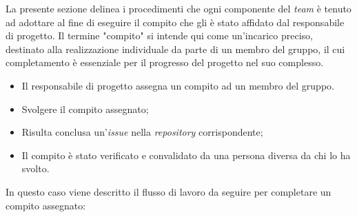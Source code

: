 \label{lavoro-sul-progetto}

La presente sezione delinea i procedimenti che ogni componente del \textit{team} è tenuto ad adottare al fine di eseguire il compito che gli è stato affidato dal responsabile di progetto.
Il termine "compito" si intende qui come un'incarico preciso, destinato alla realizzazione individuale da parte di un membro del gruppo, il cui completamento è essenziale per il progresso del progetto nel suo complesso.


\begin{itemize}
	\item Il responsabile di progetto assegna un compito ad un membro del
	      gruppo.
\end{itemize}

\begin{itemize}
	\item Svolgere il compito assegnato;
	\item Risulta conclusa un'\textit{issue\g} nella \textit{repository\g}
	      corrispondente;
	\item Il compito è stato verificato e convalidato da una persona diversa
	      da chi lo ha svolto.
\end{itemize}

In questo caso viene descritto il flusso di lavoro da seguire per completare
un compito assegnato:


